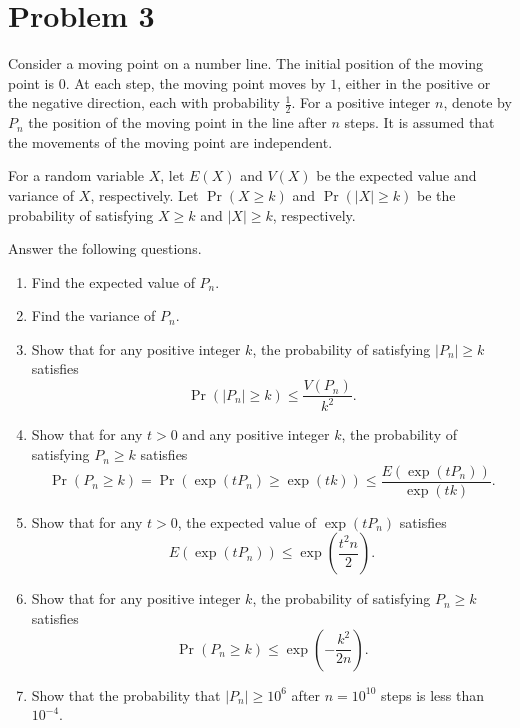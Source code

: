 \documentclass[10pt,a4paper]{article}
\begin{document}
\section*{Problem 3}

Consider a moving point on a number line. The initial position of the moving point is $0$. At each step, the moving point moves by $1$, either in the positive or the negative direction, each with probability $\frac12$. For a positive integer $n$, denote by $P_n$ the position of the moving point in the line after $n$ steps. It is assumed that the movements of the moving point are independent.

For a random variable $X$, let $E(X)$ and $V(X)$ be the expected value and variance of $X$, respectively. Let $\Pr(X\geq k)$ and $\Pr(|X|\geq k)$ be the probability of satisfying $X\geq k$ and $|X|\geq k$, respectively.

Answer the following questions.

\begin{enumerate}
  \item Find the expected value of $P_n$.

  \item Find the variance of $P_n$.

  \item Show that for any positive integer $k$, the probability of satisfying $|P_n|\geq k$ satisfies
        \[
          \Pr(|P_n|\geq k)\leq \frac{V(P_n)}{k^2}.
        \]

  \item Show that for any $t>0$ and any positive integer $k$, the probability of satisfying $P_n\geq k$ satisfies
        \[
          \Pr(P_n\geq k)
          =
          \Pr(\exp(tP_n)\geq \exp(tk))
          \leq
          \frac{E(\exp(tP_n))}{\exp(tk)}.
        \]

  \item Show that for any $t>0$, the expected value of $\exp(tP_n)$ satisfies
        \[
          E(\exp(tP_n))\leq \exp\left(\frac{t^2n}{2}\right).
        \]

  \item Show that for any positive integer $k$, the probability of satisfying $P_n\geq k$ satisfies
        \[
          \Pr(P_n\geq k)\leq \exp\left(-\frac{k^2}{2n}\right).
        \]

  \item Show that the probability that $|P_n|\geq 10^6$ after $n=10^{10}$ steps is less than $10^{-4}$.
\end{enumerate}
\end{document}
